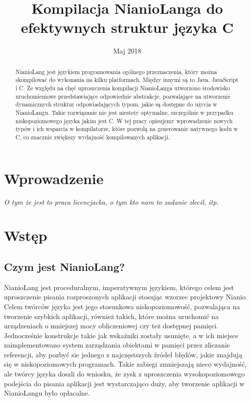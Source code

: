 \documentclass[licencjacka]{pracamgr}
\title{Kompilacja NianioLanga do efektywnych struktur języka C}
\date{Maj 2018}
\begin{document}
\maketitle

\begin{abstract}
  NianioLang jest językiem programowania ogólnego przeznaczenia, który można
  skompilować do wykonania na kilku platformach. Między innymi są to Java,
  JavaScript i C. Ze względu na chęć uproszczenia kompilacji NianioLanga
  utworzono środowisko uruchomieniowe przedstawiające odpowiednie abstrakcje,
  pozwalające na utworzenie dynamicznych struktur odpowiadających typom,
  jakie są dostępne do użycia w NianioLangu. Takie rozwiązanie nie jest
  niestety optymalne, szczególnie w przypadku niskopoziomowego języka jakim
  jest C. W tej pracy opisujemy wprowadzenie nowych typów i ich wsparcia
  w kompilatorze, które pozwolą na generowanie natywnego kodu w C, co znacznie
  zwiększy wydajność kompilowanych aplikacji.
\end{abstract}

\tableofcontents

\chapter*{Wprowadzenie}
  \emph{O tym że jest to praca licencjacka, o tym kto nam to zadanie zlecił,
    itp.}

\chapter{Wstęp}
\section{Czym jest NianioLang?}
NianioLang jest proceduralnym, imperatywnym językiem, którego celem jest uproszczenie pisania rozproszonych aplikacji stosując wzorzec projektowy Nianio\cite{wzorzec_nianio}. Celem twórców języka jest jego stosunkowa niskopoziomowość, pozwalająca na tworzenie szybkich aplikacji, również takich, które można uruchomić na urządzeniach o mniejszej mocy obliczeniowej czy też dostępnej pamięci. Jednocześnie konstrukcje takie jak wskaźniki zostały usunięte, a w ich miejsce zaimplementowano system zarządzania obiektami w pamięci przez zliczanie referencji, aby pozbyć sie jednego z najczęstszych źródeł błędów, jakie znajdują się w niskopoziomowych programach. Takie zabiegi zmniejszają nieco wydajność, ale twórcy języka doszli do wniosku, że zysk z uproszczenia wysokopoziomowego podejścia do pisania aplikacji jest wystarczająco duży, aby tworzenie aplikacji w NianioLangu było opłacalne.
\end{document}
